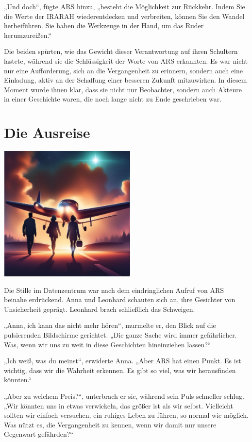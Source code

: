 \documentclass[
]{article}
\begin{document}
„Und doch``, fügte ARS hinzu, „besteht die Möglichkeit zur Rückkehr.
Indem Sie die Werte der IRARAH wiederentdecken und verbreiten, können
Sie den Wandel herbeiführen. Sie haben die Werkzeuge in der Hand, um das
Ruder herumzureißen.``

Die beiden spürten, wie das Gewicht dieser Verantwortung auf ihren
Schultern lastete, während sie die Schlüssigkeit der Worte von ARS
erkannten. Es war nicht nur eine Aufforderung, sich an die Vergangenheit
zu erinnern, sondern auch eine Einladung, aktiv an der Schaffung einer
besseren Zukunft mitzuwirken. In diesem Moment wurde ihnen klar, dass
sie nicht nur Beobachter, sondern auch Akteure in einer Geschichte
waren, die noch lange nicht zu Ende geschrieben war.

\section{Die Ausreise}\label{die-ausreise}

\includegraphics[width=2.71875in,height=2.6875in]{media/image7.png}

Die Stille im Datenzentrum war nach dem eindringlichen Aufruf von ARS
beinahe erdrückend. Anna und Leonhard schauten sich an, ihre Gesichter
von Unsicherheit geprägt. Leonhard brach schließlich das Schweigen.

„Anna, ich kann das nicht mehr hören``, murmelte er, den Blick auf die
pulsierenden Bildschirme gerichtet. „Die ganze Sache wird immer
gefährlicher. Was, wenn wir uns zu weit in diese Geschichten
hineinziehen lassen?{\kern0pt}``

„Ich weiß, was du meinst``, erwiderte Anna. „Aber ARS hat einen Punkt.
Es ist wichtig, dass wir die Wahrheit erkennen. Es gibt so viel, was wir
herausfinden könnten.``

„Aber zu welchem Preis?{\kern0pt}``, unterbrach er sie, während sein
Puls schneller schlug. „Wir könnten uns in etwas verwickeln, das größer
ist als wir selbst. Vielleicht sollten wir einfach versuchen, ein
ruhiges Leben zu führen, so normal wie möglich. Was nützt es, die
Vergangenheit zu kennen, wenn wir damit nur unsere Gegenwart
gefährden?{\kern0pt}``
\end{document}
